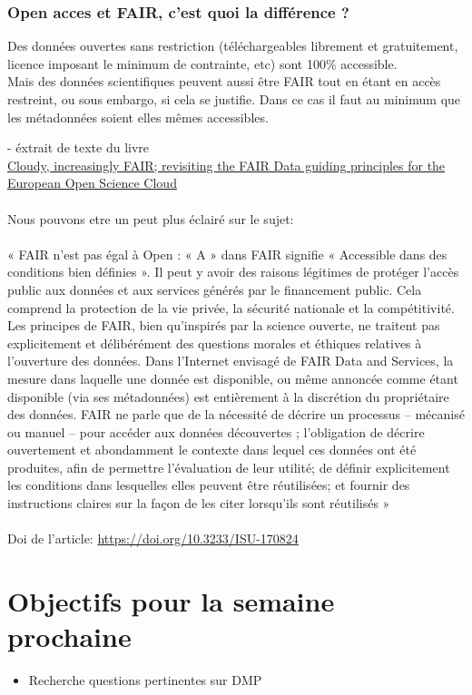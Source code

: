 \documentclass[14pt,oneside]{article}
\begin{document}
\section*{Open acces et FAIR, c'est quoi la différence ?}

Des données ouvertes sans restriction (téléchargeables librement et gratuitement, licence imposant le minimum de contrainte, etc) sont 100\% accessible.\\
Mais des données scientifiques peuvent aussi être FAIR tout en étant en accès restreint, ou sous embargo, si cela se justifie. Dans ce cas il faut au minimum que les métadonnées soient elles mêmes accessibles.

- éxtrait de texte du livre\\
\underline{Cloudy, increasingly FAIR; revisiting the FAIR Data guiding principles for the European Open Science Cloud}\\
\phantom{CA}\\
Nous pouvons etre un peut plus éclairé sur le sujet:\\
\phantom{CA}\\
« FAIR n’est pas égal à Open : « A » dans FAIR signifie « Accessible dans des conditions bien définies ». Il peut y avoir des raisons légitimes de protéger l’accès public aux données et aux services générés par le financement public. Cela comprend la protection de la vie privée, la sécurité nationale et la compétitivité. Les principes de FAIR, bien qu’inspirés par la science ouverte, ne traitent pas explicitement et délibérément des questions morales et éthiques relatives à l’ouverture des données. Dans l’Internet envisagé de FAIR Data and Services, la mesure dans laquelle une donnée est disponible, ou même annoncée comme étant disponible (via ses métadonnées) est entièrement à la discrétion du propriétaire des données. FAIR ne parle que de la nécessité de décrire un processus – mécanisé ou manuel – pour accéder aux données découvertes ; l’obligation de décrire ouvertement et abondamment le contexte dans lequel ces données ont été produites, afin de permettre l’évaluation de leur utilité; de définir explicitement les conditions dans lesquelles elles peuvent être réutilisées; et fournir des instructions claires sur la façon de les citer lorsqu’ils sont réutilisés » \\
\phantom{czc}\\
Doi de l'article: \url{https://doi.org/10.3233/ISU-170824 }
\newpage
\part*{Objectifs pour la semaine prochaine}
\begin{itemize}
	\item Recherche questions pertinentes sur DMP
\end{itemize}
\end{document}
